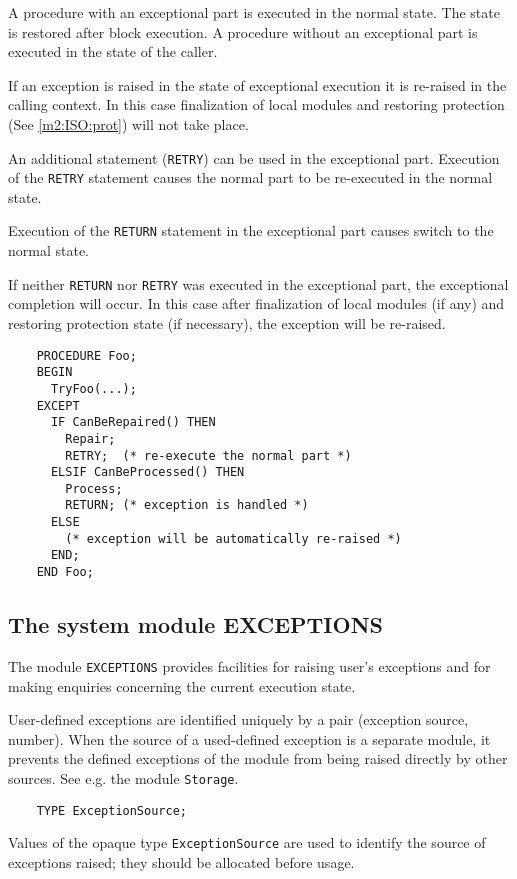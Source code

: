 A procedure with an exceptional part is executed in the normal
state. The state is restored after block execution. A
procedure without an exceptional part is executed in the state of
the caller.

If an exception is raised in the state of exceptional execution
it is re-raised in the calling context. In this case finalization
of local modules and restoring protection (See \ref{m2:ISO:prot})
will not take place.

An additional statement (\verb'RETRY') can be used in the exceptional
part. Execution of the \verb'RETRY' statement causes the normal part to
be re-executed in the normal state.

Execution of the \verb'RETURN' statement in the exceptional part
causes switch to the normal state.

If neither \verb'RETURN' nor \verb'RETRY' was executed in the exceptional part,
the exceptional completion will occur. In this case after
finalization of local modules (if any) and restoring protection
state (if necessary), the exception will be re-raised.

\Example
\begin{verbatim}
    PROCEDURE Foo;
    BEGIN
      TryFoo(...);
    EXCEPT
      IF CanBeRepaired() THEN
        Repair;
        RETRY;  (* re-execute the normal part *)
      ELSIF CanBeProcessed() THEN
        Process;
        RETURN; (* exception is handled *)
      ELSE
        (* exception will be automatically re-raised *)
      END;
    END Foo;
\end{verbatim}

\subsection{The system module EXCEPTIONS}
\label{m2:ISO:exceptions}

The module {\tt EXCEPTIONS} provides facilities for raising user's
exceptions and for making enquiries concerning the current
execution state.

User-defined exceptions are identified uniquely by a pair
(exception source, number). When the source of a used-defined
exception is a separate module, it prevents the defined
exceptions of the module from being raised directly by other
sources. See e.g. the module {\tt Storage}.

\verb'    TYPE ExceptionSource;'

Values of the opaque type {\tt ExceptionSource} are used to
identify the source of exceptions raised;
they should be allocated before usage.

